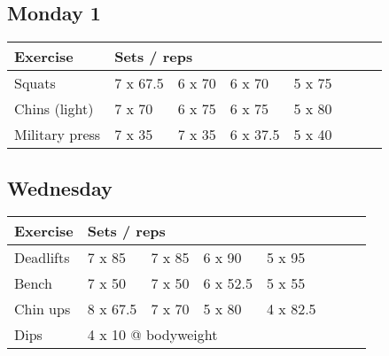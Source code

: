 \documentclass[12pt, a4paper]{article}%
\begin{document}
  \subsection*{\hspace{0.5em} Monday 1 }


  \begin{tabular}{l|lllllll}
  \hspace{0.75em} \textbf{Exercise} & \multicolumn{ 7 }{l}{ \textbf{Sets / reps} } \\ \hline

            \hspace{0.75em} Squats
            & 7 x 67.5
            & 6 x 70
            & 6 x 70
            & 5 x 75
            & 
            & 
            & 
            \\


            \hspace{0.75em} Chins (light)
            & 7 x 70
            & 6 x 75
            & 6 x 75
            & 5 x 80
            & 
            & 
            & 
            \\


            \hspace{0.75em} Military press
            & 7 x 35
            & 7 x 35
            & 6 x 37.5
            & 5 x 40
            & 
            & 
            & 
            \\


  \end{tabular}

  \subsection*{\hspace{0.5em} Wednesday }


  \begin{tabular}{l|lllllll}
  \hspace{0.75em} \textbf{Exercise} & \multicolumn{ 7 }{l}{ \textbf{Sets / reps} } \\ \hline

            \hspace{0.75em} Deadlifts
            & 7 x 85
            & 7 x 85
            & 6 x 90
            & 5 x 95
            & 
            & 
            & 
            \\


            \hspace{0.75em} Bench
            & 7 x 50
            & 7 x 50
            & 6 x 52.5
            & 5 x 55
            & 
            & 
            & 
            \\


            \hspace{0.75em} Chin ups
            & 8 x 67.5
            & 7 x 70
            & 5 x 80
            & 4 x 82.5
            & 
            & 
            & 
            \\


   \hspace{0.75em} Dips &  \multicolumn{ 7 }{l}{ 4 x 10 @ bodyweight } \\
  \end{tabular}
\end{document}
